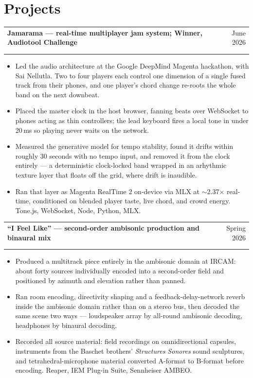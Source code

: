 \documentclass[10pt,letterpaper]{article}
\makeatletter
\newcommand{\entry}[4]{%
  \begin{tabularx}{\textwidth}{@{}X@{\hspace{8pt}}r@{}}
    \textbf{#1} & #2 \\
    \ifx\relax#3\relax\else \textit{#3} & \textit{#4} \\ \fi
  \end{tabularx}\vspace{1pt}}
\makeatother
\begin{document}
\section{Projects}
\entry{Jamarama --- real-time multiplayer jam system; Winner, Audiotool Challenge}{June 2026}{}{}
\begin{itemize}
  \item Led the audio architecture at the Google DeepMind Magenta hackathon, with Sai Nellutla. Two to four
  players each control one dimension of a single fused track from their phones, and one player's chord
  change re-roots the whole band on the next downbeat.
  \item Placed the master clock in the host browser, fanning beats over WebSocket to phones acting as thin
  controllers; the lead keyboard fires a local tone in under 20\,ms so playing never waits on the network.
  \item Measured the generative model for tempo stability, found it drifts within roughly 30 seconds with
  no tempo input, and removed it from the clock entirely --- a deterministic clock-locked band wrapped in
  an arhythmic texture layer that floats off the grid, where drift is inaudible.
  \item Ran that layer as Magenta RealTime 2 on-device via MLX at $\sim$2.37$\times$ real-time, conditioned on
  blended player taste, live chord, and crowd energy. Tone.js, WebSocket, Node, Python, MLX.
\end{itemize}
\entry{``I Feel Like'' --- second-order ambisonic production and binaural mix}{Spring 2026}{}{}
\begin{itemize}
  \item Produced a multitrack piece entirely in the ambisonic domain at IRCAM: about forty sources
  individually encoded into a second-order field and positioned by azimuth and elevation rather than panned.
  \item Ran room encoding, directivity shaping and a feedback-delay-network reverb inside the ambisonic
  domain rather than on a stereo bus, then decoded the same scene two ways --- loudspeaker array by
  all-round ambisonic decoding, headphones by binaural decoding.
  \item Recorded all source material: field recordings on omnidirectional capsules, instruments from the
  Baschet brothers' \textit{Structures Sonores} sound sculptures, and tetrahedral-microphone material
  converted A-format to B-format before encoding. Reaper, IEM Plug-in Suite, Sennheiser AMBEO.
\end{itemize}
\end{document}
